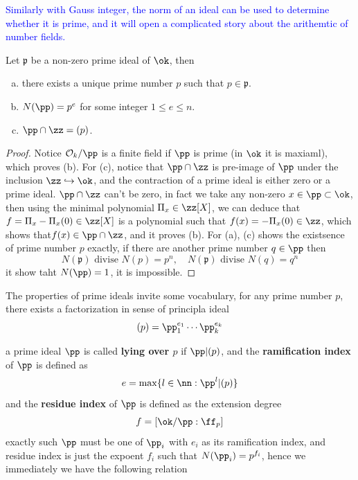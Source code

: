 \textcolor{blue}{Similarly with Gauss integer, the norm of an ideal can be used to determine whether it is prime, and it will open a complicated story about the arithemtic of number fields.}

\begin{lemma}
    Let \(\mathfrak{p}\) be a non-zero prime ideal of \(\ok\), then
    \begin{enumerate} [(a)]
        \item there exists a unique prime number \(p\) such that \(p \in \mathfrak{p}\).
        \item \(N(\pp) = p^e\) for some integer \(1\leq e \leq n\).
        \item \(\pp \cap \zz = (p)\).

    \end{enumerate}
\end{lemma}

\begin{proof}
    Notice \(\mathcal{O}_k/\pp\) is a finite field if \(\pp\) is prime (in \(\ok\) it is maxiaml), which proves (b). For (c), notice that \(\pp \cap \zz\) is pre-image of \(\pp\) under the inclusion \(\zz \hookrightarrow \ok\), and the contraction of a prime ideal is either zero or a prime ideal. \(\pp \cap \zz\) can't be zero, in fact we take any non-zero \(x \in \pp \subset \ok\), then using the minimal polynomial \(\Pi_x \in \zz[X]\), we can deduce that \(f = \Pi_x-\Pi_x(0) \in \zz[X]\) is a polynomial such that \(f(x) = -\Pi_x(0) \in \zz\), which shows that\(f(x) \in \pp \cap \zz\), and it proves (b). For (a), (c) shows the existsence of prime number \(p\) exactly, if there are another prime number \(q \in \pp\) then
    \[N(\mathfrak{p}) \text{ divise } N(p)=p^n, \quad N(\mathfrak{p}) \text{ divise } N(q)=q^n \]
    it show taht \(N(\pp) = 1\), it is impossible.
\end{proof}

The properties of prime ideals invite some vocabulary, for any prime number \(p\), there exists a factorization in sense of principla ideal
\[(p) = \pp_1^{e_1} \cdots \pp_k^{e_k}\]

a prime ideal \(\pp\) is called \textbf{lying over \(p\)} if \(\pp | (p)\), and the \textbf{ramification index} of \(\pp\) is defined as 
    \[e  = \max \{l \in \nn : \pp^l | (p) \}\]
and the \textbf{residue index} of \(\pp\) is defined as the extension degree
\[f = [\ok/\pp : \ff_p]\]
    exactly such \(\pp\) must be one of \(\pp_i\) with \(e_i\) as its ramification index, and residue index is just the expoent \(f_i\) such that \(N(\pp_i) = p^{f_i}\), hence we immediately we have the following relation

